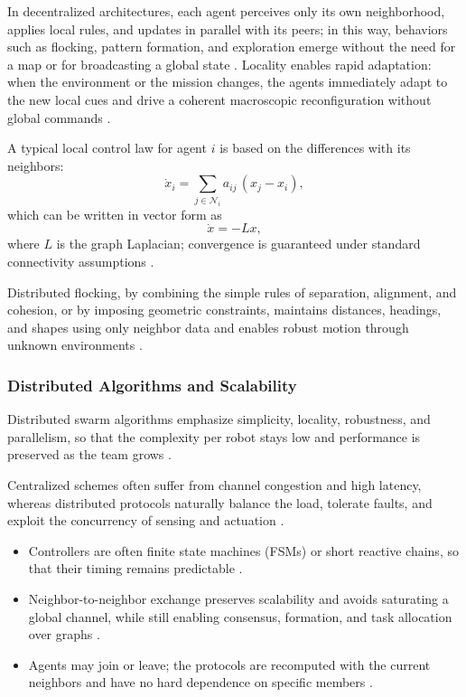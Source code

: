 In decentralized architectures, each agent perceives only its own
neighborhood, applies local rules, and updates in parallel with its peers; in
this way, behaviors such as flocking, pattern formation, and exploration emerge
without the need for a map or for broadcasting a global state \cite{hamann2018swarm}.
Locality enables rapid adaptation: when the environment or the mission changes,
the agents immediately adapt to the new local cues and drive a coherent
macroscopic reconfiguration without global commands \cite{dias2021swarm}.

A typical local control law for agent $i$ is based on the differences with its
neighbors:
\begin{equation}
  \dot{x}_i = \sum_{j \in \mathcal{N}_i} a_{ij}\,\left(x_j - x_i\right),
  \label{eq:consensus-agent}
\end{equation}
which can be written in vector form as
\begin{equation}
  \dot{x} = -L x,
  \label{eq:consensus-vector}
\end{equation}
where $L$ is the graph Laplacian; convergence is guaranteed under standard
connectivity assumptions \cite{hamann2018swarm}.

Distributed flocking, by combining the simple rules of separation, alignment, and
cohesion, or by imposing geometric constraints, maintains distances, headings,
and shapes using only neighbor data and enables robust motion through unknown
environments \cite{reynolds1987flocks}.

\subsubsection{Distributed Algorithms and Scalability}

Distributed swarm algorithms emphasize simplicity, locality, robustness, and
parallelism, so that the complexity per robot stays low and performance is
preserved as the team grows \cite{nguyen2024swarm}.

Centralized schemes often suffer from channel congestion and high latency,
whereas distributed protocols naturally balance the load, tolerate faults, and
exploit the concurrency of sensing and actuation \cite{hamann2018swarm}.
\begin{itemize}
  \item {} Controllers are often finite
        state machines (FSMs) or short reactive chains, so that their timing
        remains predictable \cite{hamann2018swarm}.
  \item {} Neighbor-to-neighbor exchange preserves
        scalability and avoids saturating a global channel, while still enabling
        consensus, formation, and task allocation over graphs \cite{tan2013research}.
  \item {} Agents may join or leave; the protocols are
        recomputed with the current neighbors and have no hard dependence on
        specific members \cite{dias2021swarm}.
\end{itemize}

